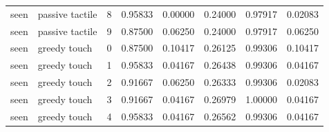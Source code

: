 \documentclass{article}
\begin{document}
\begin{center}
\begin{longtable}{llllllll}
seen & passive tactile & 8 & 0.95833 & 0.00000 & 0.24000 & 0.97917 & 0.02083 \\
seen & passive tactile & 9 & 0.87500 & 0.06250 & 0.24000 & 0.97917 & 0.06250 \\
seen & greedy touch & 0 & 0.87500 & 0.10417 & 0.26125 & 0.99306 & 0.10417 \\
seen & greedy touch & 1 & 0.95833 & 0.04167 & 0.26438 & 0.99306 & 0.04167 \\
seen & greedy touch & 2 & 0.91667 & 0.06250 & 0.26333 & 0.99306 & 0.02083 \\
seen & greedy touch & 3 & 0.91667 & 0.04167 & 0.26979 & 1.00000 & 0.04167 \\
seen & greedy touch & 4 & 0.95833 & 0.04167 & 0.26562 & 0.99306 & 0.04167 \\
\bottomrule
\end{longtable}
\renewcommand{\arraystretch}{1.0}
\end{center}
\end{document}
